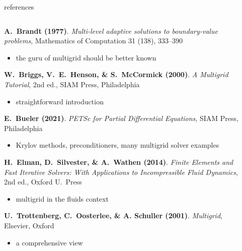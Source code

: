 \documentclass[10pt,
               svgnames,
               hyperref={colorlinks,citecolor=DeepPink4,linkcolor=FireBrick,urlcolor=Maroon},
               usepdftitle=false]{beamer}
\begin{document}
\begin{frame}{references}

\begin{columns}
\begin{column}{0.8\textwidth}
\begin{itemize}
{\small
\item[] \textbf{A.~Brandt (1977)}. \emph{Multi-level adaptive solutions to boundary-value problems}, Mathematics of Computation 31 (138), 333--390
    \begin{itemize}
    \item[$\circ$] the guru of multigrid should be better known
    \end{itemize}
\item[] \textbf{W.~Briggs, V.~E.~Henson, \& S.~McCormick (2000)}.  \emph{A Multigrid Tutorial}, 2nd ed., SIAM Press, Philadelphia
    \begin{itemize}
    \item[$\circ$] straightforward introduction
    \end{itemize}
\item[] \textbf{E.~Bueler (2021)}. \emph{PETSc for Partial Differential Equations}, SIAM Press, Philadelphia
    \begin{itemize}
    \item[$\circ$] Krylov methods, preconditioners, many multigrid solver examples
    \end{itemize}
\item[] \textbf{H.~Elman, D.~Silvester, \& A.~Wathen (2014)}. \emph{Finite Elements and Fast Iterative Solvers: With Applications to Incompressible Fluid Dynamics}, 2nd ed., Oxford U.~Press
    \begin{itemize}
    \item[$\circ$] multigrid in the fluids context
    \end{itemize}
\item[] \textbf{U.~Trottenberg, C.~Oosterlee, \& A. Schuller (2001)}.  \emph{Multigrid}, Elsevier, Oxford
    \begin{itemize}
    \item[$\circ$] a comprehensive view
    \end{itemize}
}
\end{itemize}
\end{column}
\begin{column}{0.17\textwidth}

\end{column}
\end{columns}
\end{frame}
\end{document}
